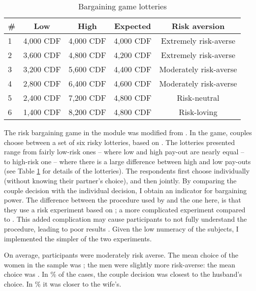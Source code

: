 \documentclass[11pt,a4paper]{scrartcl} %
\begin{document}
\begin{table}[h]
	\centering
	\caption{Bargaining game lotteries}
	\label{tab:bargaining}
	\begin{tabular}{l c c c c}
	\toprule
	\# & Low & High & Expected & Risk aversion \\
	\hline
	1 & 4,000 CDF & 4,000 CDF & 4,000 CDF & Extremely risk-averse \\
	2 & 3,600 CDF & 4,800 CDF & 4,200 CDF & Extremely risk-averse \\
	3 & 3,200 CDF & 5,600 CDF & 4,400 CDF & Moderately risk-averse \\
	4 & 2,800 CDF & 6,400 CDF & 4,600 CDF & Moderately risk-averse \\
	5 & 2,400 CDF & 7,200 CDF & 4,800 CDF & Risk-neutral \\
	6 & 1,400 CDF & 8,200 CDF & 4,800 CDF & Risk-loving \\ 
	\bottomrule
	\end{tabular}
\end{table}

The risk bargaining game in the module was modified from \cite{Martinsson2009}. In the game, couples choose between a set of six risky lotteries, based on \cite{Eckel2002}. The lotteries presented range from fairly low-risk ones -- where low and high pay-out are nearly equal -- to high-risk one -- where there is a large difference between high and low pay-outs (see Table \ref{tab:bargaining} for details of the lotteries). The respondents first choose individually (without knowing their partner's choice), and then jointly. By comparing the couple decision with the individual decision, I obtain an indicator for bargaining power. The difference between the procedure used by \cite{Martinsson2009} and the one here, is that they use a risk experiment based on \cite{Holt2002}; a more complicated experiment compared to \citeauthor{Eckel2002}. This added complication may cause participants to not fully understand the procedure, leading to poor results \citep{Dave2010a}. Given the low numeracy of the subjects, I implemented the simpler of the two experiments.

On average, participants were moderately risk averse. The mean choice of the women in the sample was ; the men were slightly more risk-averse:  the mean choice was . In \% of the cases, the couple decision was closest to the husband's choice. In \% it was closer to the wife's.
\end{document}
